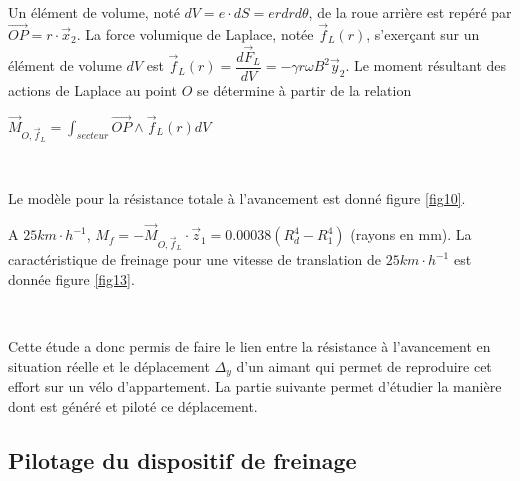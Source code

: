 
Un élément de volume, noté $dV=e\cdot dS=erdrd\theta$, de la roue arrière est repéré par $\overrightarrow{OP}=r\cdot \vec{x}_2$. La force volumique de Laplace, notée $\vec{f}_L(r)$, s’exerçant sur un élément de volume $dV$ est $\vec{f}_L(r)=\dfrac{d\vec{F}_L}{dV}=-\gamma r \omega B^2\vec{y}_2$. Le moment résultant des actions de Laplace au point $O$ se détermine à partir de la relation

\begin{center}
$\vec{M}_{O,\vec{f}_L}=\int_{secteur} \overrightarrow{OP}\wedge \vec{f}_L(r)dV$
\end{center}


~\

Le modèle pour la résistance totale à l’avancement est donné figure \ref{fig10}.

A $25km\cdot h^{-1}$, $M_f=-\vec{M}_{O,\vec{f}_L}\cdot \vec{z}_1=0.00038(R_d^4-R_1^4)$ (rayons en mm). La caractéristique de freinage pour une vitesse de translation de $25km\cdot h^{-1}$ est donnée figure \ref{fig13}.



~\

Cette étude a donc permis de faire le lien entre la résistance à l’avancement en situation réelle et le déplacement $\Delta_y$ d’un aimant qui permet de reproduire cet effort sur un vélo d’appartement. La partie suivante permet d’étudier la manière dont est généré et piloté ce déplacement.

\subsection{Pilotage du dispositif de freinage}



